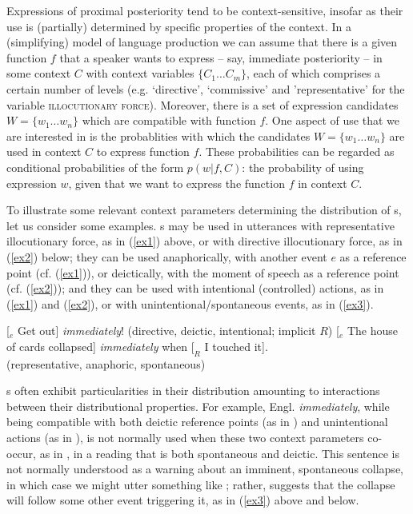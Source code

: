 Expressions of proximal posteriority tend to be context-sensitive,
insofar as their use is (partially) determined by specific
properties of the context.  In a (simplifying) model of language
production we can assume that there is a given function $f$ that a
speaker wants to express -- say, immediate posteriority -- in some
context $C$ with context variables $\{C_1 \ldots C_m\}$, each of which
comprises a certain number of levels (e.g. `directive', `commissive'
and 'representative' for the variable \textsc{illocutionary force}).
Moreover, there is a set of expression candidates
$W=\{w_1 \ldots w_n\}$ which are compatible with function $f$. One
aspect of use that we are interested in is the probablities
with which the candidates $W=\{w_1 \ldots w_n\}$ are used
in context $C$ to express function $f$.
These probabilities can be regarded as conditional probabilities of
the form $p(w|f,C)$: the probability of using expression $w$, given that we
want to express the function $f$ in context $C$.

To illustrate some relevant context parameters determining the
distribution of \ipadv s, let us consider some examples. \ipadv s may
be used in utterances with representative illocutionary force, as in
(\ref{ex1}) above, or with directive illocutionary force, as in
(\ref{ex2}) below; they can be used anaphorically, with another event
$e$ as a reference point (cf. (\ref{ex1})), or deictically, with the
moment of speech as a reference point (cf. (\ref{ex2})); and they can
be used with intentional (controlled) actions, as in (\ref{ex1}) and
(\ref{ex2}), or with unintentional/spontaneous events, as in
(\ref{ex3}).

\begin{exe}
  \ex\label{ex2} [$_e$ Get out] \textit{immediately}! (directive, deictic, intentional; implicit $R$)    
  \ex\label{ex3} [$_e$ The house of cards  collapsed] \textit{immediately} when $[_R$ I touched it].\\(representative, anaphoric, spontaneous)
\end{exe}
%
\ipadv s often exhibit particularities in their distribution amounting
to interactions between their distributional properties. For example,
Engl. \textit{immediately}, while being compatible with both deictic
reference points (as in ) and unintentional actions (as in
), is not normally used when these two context parameters
co-occur, as in , in a reading that is both spontaneous and deictic. This
sentence is not normally understood as a warning about an imminent,
spontaneous collapse, in which case we might utter something like ; rather,
 suggests that the collapse will follow some other event
triggering it, as in (\ref{ex3}) above and  below.

